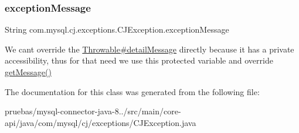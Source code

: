 \subsubsection{\texorpdfstring{exception\+Message}{exceptionMessage}}
{\footnotesize\ttfamily String com.\+mysql.\+cj.\+exceptions.\+C\+J\+Exception.\+exception\+Message\hspace{0.3cm}{\ttfamily [protected]}}

We can\textquotesingle{}t override the \mbox{\hyperlink{}{Throwable\#detail\+Message}} directly because it has a private accessibility, thus for that need we use this protected variable and override \mbox{\hyperlink{}{get\+Message()}} 

The documentation for this class was generated from the following file\+:\begin{DoxyCompactItemize}
\item 
pruebas/mysql-\/connector-\/java-\/8../src/main/core-\/api/java/com/mysql/cj/exceptions/C\+J\+Exception.\+java\end{DoxyCompactItemize}
